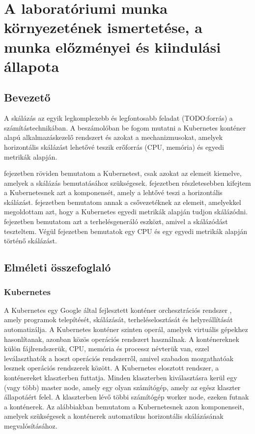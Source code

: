 \documentclass[a4paper,oneside]{article}
\begin{document}
\section{A laboratóriumi munka környezetének ismertetése,
     a munka előzményei és kiindulási állapota}
\label{sec:kornyezet}
\subsection{Bevezető}
\label{sec:bevezeto}

A skálázás az egyik legkomplexebb és legfontosabb feladat (TODO:forrás) a
számítástechnikában. A beszámolóban be fogom mutatni a Kubernetes konténer alapú
alkalmazáskezelő rendszert és azokat a mechanizmusokat, amelyek  horizontális
skálázást lehetővé teszik erőforrás (CPU, memória) és egyedi metrikák alapján.

 fejezetben röviden bemutatom a Kubernetest, csak azokat
az elemeit kiemelve, amelyek a skálázás bemutatásához szükségesek.
 fejezetben részletesebben kifejtem a Kubernetesnek azt a
komponensét, amely a lehtővé teszi a horizontális skálázást.
 fejezetben bemutatom annak a csővezetéknek az
elemeit, amelyekkel megoldottam azt, hogy a Kubernetes egyedi metrikák alapján
tudjon skálázódni.  fejezetben bemutatom azt a terhelésgeneráló
eszközt, amivel a skálázódást teszteltem. Végül 
fejezetben bemutatok egy CPU és egy egyedi metrikák alapján történő skálázást.

\subsection{Elméleti összefoglaló}

\subsubsection{Kubernetes}
\label{secsec:kubernetes}

A Kubernetes egy Google által fejlesztett konténer orchesztrációs rendszer
\cite{kubernetes}, amely programok telepítését, skálázását, terheléselosztását
és helyreállítását automatizálja. A Kubernetes konténer szinten operál, amelyek
virtuális gépekhez hasonlítanak, azonban közös operációs rendszert használnak. A
konténereknek külön fájlrendszerük, CPU, memória és processz névterük van, ezzel
leválaszthatók a hoszt operációs rendszerről, amivel szabadon mozgathatóak
lesznek operációs rendszerek között. A Kubernetes elosztott rendszer, a
konténereket klaszterben futtatja. Minden klaszterben kiválasztásra kerül egy
(vagy több) master node, amely egy olyan számítógép, amely az egész klaszter
állapotáért felel. A klaszterben lévő többi számítógép worker node, ezeken
futnak a konténerek.  Az alábbiakban bemutatom a Kubernetesnek azon
komponenseit, amelyek szükségesek a konténerek automatikus horizontális
skálázásának megvalósításához.
\end{document}
